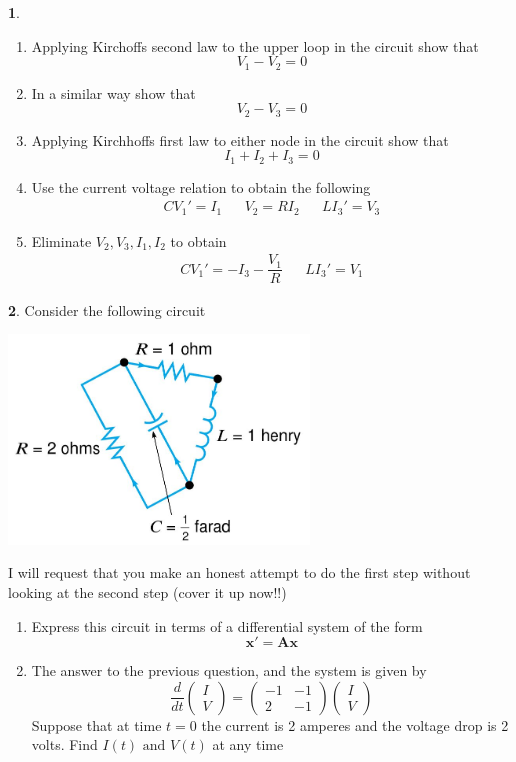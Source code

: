 \documentclass[11pt]{article}
\theoremstyle{definition}
\newtheorem{q}{}
\begin{document}
\begin{multicols*}{2}
\begin{q}
			\begin{enumerate}
				\item Applying Kirchoffs second law to the upper loop in the circuit show that \[ V_1 - V_2 = 0 \]
				\item In a similar way show that \[ V_2 - V_3 = 0 \]
				\item Applying Kirchhoffs first law to either node in the circuit show that \[ I_1 + I_2 + I_3 = 0 \] 
				\item Use the current voltage relation to obtain the following 
					\begin{align*}
						CV_1 ' = I_1 && V_2 = RI_2 && LI_3' = V_3
					\end{align*}
				\item Eliminate $ V_2, V_3, I_1, I_2 $ to obtain 
					\begin{align*}
					CV_1 ' = -I_3-\dfrac{V_1}{R} && LI_3' = V_1
					\end{align*}
			\end{enumerate}
		\end{q}
		\begin{q}
			Consider the following circuit 
			\begin{center}
				\includegraphics[width=8cm]{circuit2}
			\end{center}
			I will request that you make an honest attempt to do the first step without looking at the second step (cover it up now!!)
			\begin{enumerate}
				\item Express this circuit in terms of a differential system of the form \[ \textbf{x}' = \textbf{Ax} \] 
				\item The answer to the previous question, and the system is given by 
				\[ \dfrac{d}{dt} \left(\begin{matrix} I \\ V \end{matrix}\right) = \left(\begin{matrix} -1 & -1 \\ 2 & -1 \end{matrix}\right) \left(\begin{matrix} I \\ V \end{matrix}\right)   \] Suppose that at time $ t =0 $ the current is 2 amperes and the voltage drop is 2 volts. Find $ I(t) \text{ and } V(t) $ at any time

\end{enumerate}
\end{q}
\end{multicols*}
\end{document}
